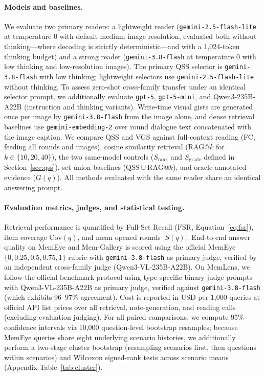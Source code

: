 \documentclass[10pt]{article}
\newcommand{\qss}{QSS}
\begin{document}
\paragraph{Models and baselines.} We evaluate two primary readers: a lightweight reader (\texttt{gemini-2.5-flash-lite} at temperature 0 with default medium image resolution, evaluated both without thinking—where decoding is strictly deterministic—and with a 1,024-token thinking budget) and a strong reader (\texttt{gemini-3.8-flash} at temperature 0 with low thinking and low-resolution images). The primary \qss{} selector is \texttt{gemini-3.8-flash} with low thinking; lightweight selectors use \texttt{gemini-2.5-flash-lite} without thinking. To assess zero-shot cross-family transfer under an identical selector prompt, we additionally evaluate \texttt{gpt-5}, \texttt{gpt-5-mini}, and Qwen3-235B-A22B (instruction and thinking variants). Write-time visual gists are generated once per image by \texttt{gemini-3.8-flash} from the image alone, and dense retrieval baselines use \texttt{gemini-embedding-2} over round dialogue text concatenated with the image caption. We compare \qss{} and VGS against full-context reading (FC, feeding all rounds and images), cosine similarity retrieval (RAG@$k$ for $k \in \{10, 20, 40\}$), the two same-model controls ($S_{\mathrm{rank}}$ and $S_{\mathrm{grade}}$ defined in Section~\ref{sec:qss}), set union baselines ($\text{\qss{}} \cup \text{RAG@}k$), and oracle annotated evidence ($G(q)$). All methods evaluated with the same reader share an identical answering prompt.

\paragraph{Evaluation metrics, judges, and statistical testing.} Retrieval performance is quantified by Full-Set Recall ($\mathrm{FSR}$, Equation~\eqref{eq:fsr}), item coverage $\mathrm{Cov}(q)$, and mean opened rounds $|S(q)|$. End-to-end answer quality on MemEye and Mem-Gallery is scored using the official MemEye $\{0, 0.25, 0.5, 0.75, 1\}$ rubric with \texttt{gemini-3.8-flash} as primary judge, verified by an independent cross-family judge (Qwen3-VL-235B-A22B). On MemLens, we follow the official benchmark protocol using type-specific binary judge prompts with Qwen3-VL-235B-A22B as primary judge, verified against \texttt{gemini-3.8-flash} (which exhibits 96--97\% agreement). Cost is reported in USD per 1,000 queries at official API list prices over all retrieval, note-generation, and reading calls (excluding evaluation judging). For all paired comparisons, we compute 95\% confidence intervals via 10,000 question-level bootstrap resamples; because MemEye queries share eight underlying scenario histories, we additionally perform a two-stage cluster bootstrap (resampling scenarios first, then questions within scenarios) and Wilcoxon signed-rank tests across scenario means (Appendix Table~\ref{tab:cluster}).
\end{document}
